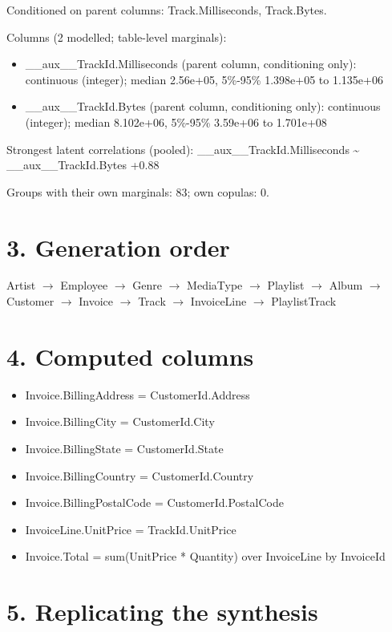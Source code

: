 \documentclass[10pt]{article}
\begin{document}
Conditioned on parent columns: Track.Milliseconds, Track.Bytes.

Columns (2 modelled; table-level marginals):


\begin{itemize}
\item \_\_aux\_\_TrackId.Milliseconds (parent column, conditioning only): continuous (integer); median 2.56e+05, 5\%-95\% 1.398e+05 to 1.135e+06
\item \_\_aux\_\_TrackId.Bytes (parent column, conditioning only): continuous (integer); median 8.102e+06, 5\%-95\% 3.59e+06 to 1.701e+08
\end{itemize}
Strongest latent correlations (pooled): \_\_aux\_\_TrackId.Milliseconds \textasciitilde{} \_\_aux\_\_TrackId.Bytes +0.88

Groups with their own marginals: 83; own copulas: 0.



\section*{3. Generation order}

Artist $\rightarrow$ Employee $\rightarrow$ Genre $\rightarrow$ MediaType $\rightarrow$ Playlist $\rightarrow$ Album $\rightarrow$ Customer $\rightarrow$ Invoice $\rightarrow$ Track $\rightarrow$ InvoiceLine $\rightarrow$ PlaylistTrack

\section*{4. Computed columns}

\begin{itemize}
\item Invoice.BillingAddress = CustomerId.Address
\item Invoice.BillingCity = CustomerId.City
\item Invoice.BillingState = CustomerId.State
\item Invoice.BillingCountry = CustomerId.Country
\item Invoice.BillingPostalCode = CustomerId.PostalCode
\item InvoiceLine.UnitPrice = TrackId.UnitPrice
\item Invoice.Total = sum(UnitPrice * Quantity) over InvoiceLine by InvoiceId
\end{itemize}

\section*{5. Replicating the synthesis}
\end{document}
